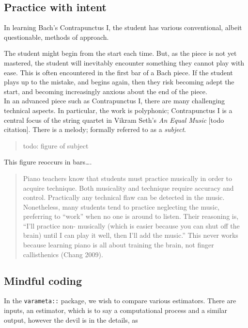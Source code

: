 \documentclass[
]{article}
\begin{document}
\hypertarget{practice-with-intent}{%
\subsection{Practice with intent}\label{practice-with-intent}}

In learning Bach's Contrapunctus I, the student has various conventional, albeit questionable, methods of approach.

The student might begin from the start each time. But, as the piece is not yet mastered, the student will inevitably encounter something they cannot play with ease. This is often encountered in the first bar of a Bach piece. If the student plays up to the mistake, and begins again, then they risk becoming adept the start, and becoming increasingly anxious about the end of the piece.\\
In an advanced piece such as Contrapunctus I, there are many challenging technical aspects. In particular, the work is polyphonic; Contrapunctus I is a central focus of the string quartet in Vikram Seth's \emph{An Equal Music} {[}todo citation{]}. There is a melody; formally referred to as a \emph{subject}.

\begin{quote}
todo: figure of subject
\end{quote}

This figure reoccurs in bars\ldots.

\begin{quote}
Piano teachers know that students
must practice musically in order to acquire
technique. Both musicality and technique
require accuracy and control. Practically
any technical flaw can be detected in the
music. Nonetheless, many students tend to
practice neglecting the music, preferring to
``work'' when no one is around to listen.
Their reasoning is, ``I'll practice non-
musically (which is easier because you can
shut off the brain) until I can play it well,
then I'll add the music.'' This never works
because learning piano is all about training
the brain, not finger callisthenics (Chang 2009).
\end{quote}

\hypertarget{mindful-coding}{%
\subsection{Mindful coding}\label{mindful-coding}}

In the \texttt{varameta::} package, we wish to compare various estimators. There are inputs, an estimator, which is to say a computational process and a similar output, however the devil is in the details, as
\end{document}
